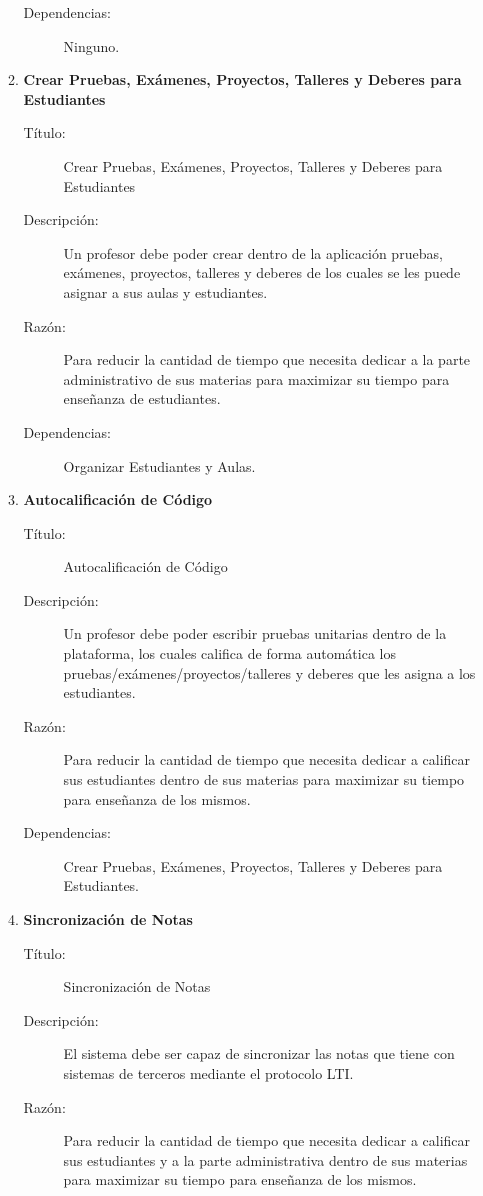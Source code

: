 \begin{enumerate}
\begin{enumerate}
\begin{description}
			\item[Dependencias:] Ninguno.
        \end{description}
		\item \textbf{Crear Pruebas, Exámenes, Proyectos, Talleres y Deberes para Estudiantes}
        \begin{description}
			\item[Título:] Crear Pruebas, Exámenes, Proyectos, Talleres y Deberes para Estudiantes
			\item[Descripción:] Un profesor debe poder crear dentro de la aplicación pruebas, exámenes, proyectos, talleres y deberes de los cuales se les puede asignar a sus aulas y estudiantes.
			\item[Razón:] Para reducir la cantidad de tiempo que necesita dedicar a la parte administrativo de sus materias para maximizar su tiempo para enseñanza de estudiantes.
			\item[Dependencias:] Organizar Estudiantes y Aulas.
        \end{description}
		\item \textbf{Autocalificación de Código}
        \begin{description}
			\item[Título:] Autocalificación de Código
			\item[Descripción:] Un profesor debe poder escribir pruebas unitarias dentro de la plataforma, los cuales califica de forma automática los pruebas/exámenes/proyectos/talleres y deberes que les asigna a los estudiantes.
			\item[Razón:] Para reducir la cantidad de tiempo que necesita dedicar a calificar sus estudiantes dentro de sus materias para maximizar su tiempo para enseñanza de los mismos.
			\item[Dependencias:] Crear Pruebas, Exámenes, Proyectos, Talleres y Deberes para Estudiantes.
        \end{description}
		\item \textbf{Sincronización de Notas}
        \begin{description}
			\item[Título:] Sincronización de Notas
			\item[Descripción:] El sistema debe ser capaz de sincronizar las notas que tiene con sistemas de terceros mediante el protocolo LTI.
			\item[Razón:] Para reducir la cantidad de tiempo que necesita dedicar a calificar sus estudiantes y a la parte administrativa dentro de sus materias para maximizar su tiempo para enseñanza de los mismos.

\end{description}
\end{enumerate}
\end{enumerate}
